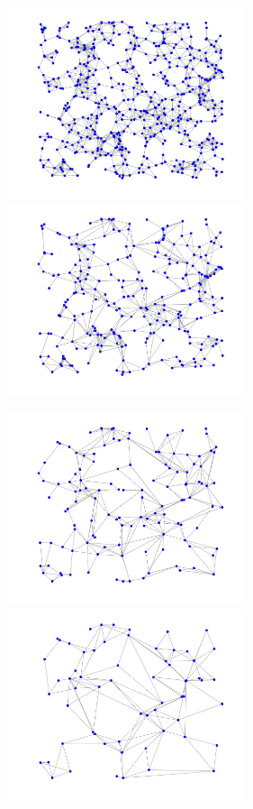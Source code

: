 \documentclass[a4paper]{article}
\begin{document}
\begin{figure}[H]
\centering
\includegraphics[width = 7cm]{multiresolution/multires1}
\includegraphics[width = 7cm]{multiresolution/multires2}

\includegraphics[width = 7cm]{multiresolution/multires3}
\includegraphics[width = 7cm]{multiresolution/multires4}


\end{figure}
\end{document}
